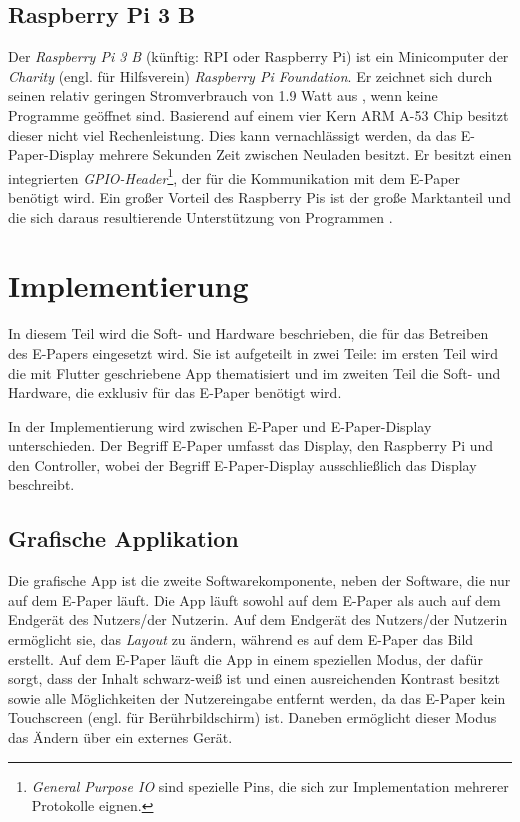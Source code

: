 \documentclass[10pt]{article}
\begin{document}
\subsection{Raspberry Pi 3 B}
Der \textit{Raspberry Pi 3 B} (künftig: RPI oder Raspberry Pi) ist ein Minicomputer der \textit{Charity} (engl. für Hilfsverein) \textit{Raspberry Pi Foundation}. 
Er zeichnet sich durch seinen relativ geringen Stromverbrauch von 1.9 Watt aus \cite{RPI-power-consumption}, wenn keine Programme geöffnet sind. Basierend auf einem vier Kern ARM A-53 Chip \cite{RPI-Specs} besitzt dieser nicht viel Rechenleistung. Dies kann vernachlässigt werden, da das E-Paper-Display mehrere Sekunden Zeit zwischen Neuladen besitzt. Er besitzt einen integrierten \textit{GPIO-Header}\footnote{\textit{General Purpose IO} sind spezielle Pins, die sich zur Implementation mehrerer Protokolle eignen.}, der für die Kommunikation mit dem E-Paper benötigt wird. Ein großer Vorteil des Raspberry Pis ist der große Marktanteil und die sich daraus resultierende Unterstützung von Programmen \cite{RPI-market-share}.

\section{Implementierung}
In diesem Teil wird die Soft- und Hardware beschrieben, die für das Betreiben des E-Papers eingesetzt wird.
Sie ist aufgeteilt in zwei Teile: im ersten Teil wird die mit Flutter geschriebene App thematisiert und im zweiten Teil die Soft- und Hardware, die exklusiv für das E-Paper benötigt wird.


In der Implementierung wird zwischen E-Paper und E-Paper-Display unterschieden. Der Begriff E-Paper umfasst das Display, den Raspberry Pi und den Controller, wobei der Begriff E-Paper-Display ausschließlich das Display beschreibt.


\subsection{Grafische Applikation}
Die grafische App ist die zweite Softwarekomponente, neben der Software, die nur auf dem E-Paper läuft. Die App läuft sowohl auf dem E-Paper als auch auf dem Endgerät des Nutzers/der Nutzerin. Auf dem Endgerät des Nutzers/der Nutzerin ermöglicht sie, das \textit{Layout} 
zu ändern, während es auf dem E-Paper das Bild erstellt. Auf dem E-Paper läuft die App in einem speziellen Modus, der dafür sorgt, dass der Inhalt schwarz-weiß ist und einen ausreichenden Kontrast besitzt sowie alle Möglichkeiten der Nutzereingabe entfernt werden, da das E-Paper kein Touchscreen (engl. für Berührbildschirm) ist. Daneben ermöglicht dieser Modus das Ändern über ein externes Gerät. 
\end{document}
